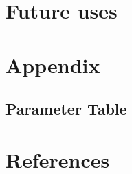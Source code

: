 \documentclass{article}
\begin{document}
\newpage
\section{Future uses}

\newpage
\section{Appendix}
\subsection{Parameter Table}

\newpage
\section{References}


\end{document}
